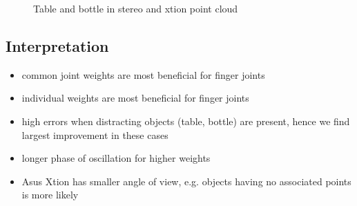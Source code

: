 \begin{figure}
\centering
{}
\hspace{1cm}
\caption{Table and bottle in stereo and xtion point cloud}
\label{fig:bottle_point_cloud}
\end{figure}

\subsection{Interpretation}

\begin{itemize}
\item common joint weights are most beneficial for finger joints
\item individual weights are most beneficial for finger joints
\item high errors when distracting objects (table, bottle) are present, hence we find largest improvement in these cases
\item longer phase of oscillation for higher weights
\item Asus Xtion has smaller angle of view, e.g. objects having no associated points is more likely
\end{itemize}